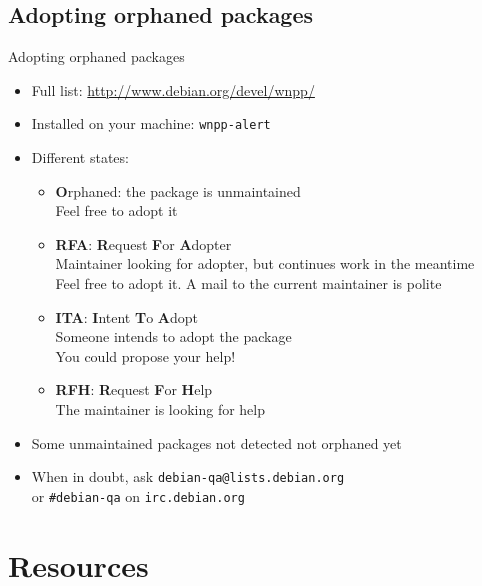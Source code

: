 \documentclass[10pt,final]{beamer}
\begin{document}
\subsection{Adopting orphaned packages}
\begin{frame}{Adopting orphaned packages}
  \begin{itemize}
  \item Full list: \url{http://www.debian.org/devel/wnpp/}
    \hbr
  \item Installed on your machine: \texttt{wnpp-alert}
    \hbr
  \item Different states:
    \begin{itemize}
    \item \textbf{O}rphaned: the package is unmaintained\\
      Feel free to adopt it
    \item \textbf{RFA}: \textbf{R}equest \textbf{F}or \textbf{A}dopter\\
      Maintainer looking for adopter, but continues work in the meantime\\
      Feel free to adopt it. A mail to the current maintainer is polite
    \item \textbf{ITA}: \textbf{I}ntent \textbf{T}o \textbf{A}dopt\\
      Someone intends to adopt the package\\
      You could propose your help!
    \item \textbf{RFH}: \textbf{R}equest \textbf{F}or \textbf{H}elp\\
      The maintainer is looking for help
    \end{itemize}
    \hbr
  \item Some unmaintained packages not detected \arr not orphaned yet
    \hbr
  \item When in doubt, ask \texttt{debian-qa@lists.debian.org} \\
    or \texttt{\#debian-qa} on \texttt{irc.debian.org}
    
  \end{itemize}
\end{frame}

\section{Resources}
\end{document}

